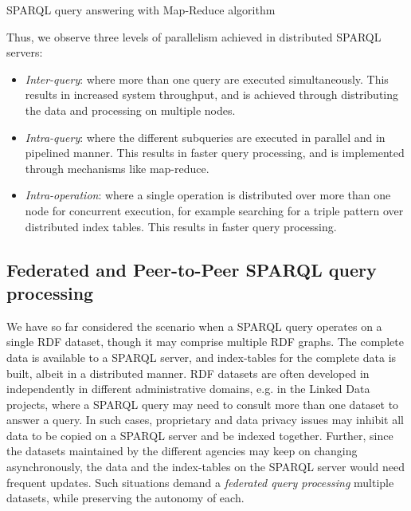 \begin{algorithm}[H]
        \SetAlgoLined
        \DontPrintSemicolon
        \caption{SPARQL query answering with Map-Reduce algorithm}
        \label{algo:knowledge:sparql}
\end{algorithm}

\noindent
Thus, we observe three levels of parallelism achieved in distributed SPARQL servers:
\begin{itemize}
	\item {\em Inter-query}: where more than one query are executed simultaneously. This results in increased system
		throughput, and is achieved through distributing the data and processing on multiple nodes.
	\item {\em Intra-query}: where the different subqueries are executed in parallel and in pipelined manner. This results
		in faster query processing, and is implemented through mechanisms like map-reduce. 
	\item {\em Intra-operation}: where a single operation is distributed over more than one node for concurrent execution,
		for example searching for a triple pattern over distributed index tables. This results in faster query processing.
\end{itemize}

\subsection{Federated and Peer-to-Peer SPARQL query processing}

 
We have so far considered the scenario when a SPARQL query operates on a single RDF dataset, though it may comprise multiple
RDF graphs. The complete data is available to a SPARQL server, and index-tables for the complete data is built, albeit in a 
distributed manner.  
%
RDF datasets are often developed in independently in different administrative domains, e.g. in the Linked Data projects, where a 
SPARQL query may need to consult more than one dataset to answer a query. In such cases, proprietary and data privacy issues may 
inhibit all data to be copied on a SPARQL server and be indexed together. Further, since the datasets maintained by the different 
agencies may keep on changing asynchronously, the data and the index-tables on the SPARQL server would need frequent updates.
%
Such situations demand a {\em federated query processing} multiple datasets, while preserving the autonomy of each. 

